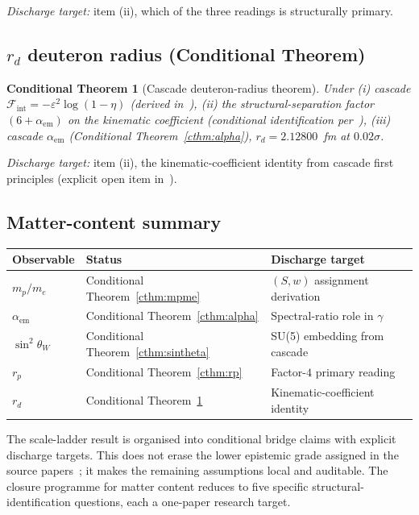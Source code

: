 \documentclass[11pt]{article}
\theoremstyle{plain}
\newtheorem{conditional}[theorem]{Conditional Theorem}
\theoremstyle{definition}
\theoremstyle{remark}
\begin{document}
\emph{Discharge target:} item (ii), which of the three readings is structurally primary.

\subsection{$r_d$ deuteron radius (Conditional Theorem)}\label{sec:matter-rd}

\begin{conditional}[Cascade deuteron-radius theorem]\label{cthm:rd}
Under (i) cascade $\mathcal{F}_\mathrm{int} = -\varepsilon^2 \log(1-\eta)$ (derived in~\citealp{SmartXXXII}), (ii) the structural-separation factor $(6 + \alpha_\mathrm{em})$ on the kinematic coefficient (conditional identification per~\citealp{SmartXXXII}), (iii) cascade $\alpha_\mathrm{em}$ (Conditional Theorem~\ref{cthm:alpha}), $r_d = 2.12800$~fm at $0.02\sigma$.
\end{conditional}

\emph{Discharge target:} item (ii), the kinematic-coefficient identity from cascade first principles (explicit open item in~\citealp{SmartXXXII}).

\subsection{Matter-content summary}\label{sec:matter-summary}

\begin{center}
\renewcommand{\arraystretch}{1.2}
\footnotesize
\begin{tabular}{l p{4cm} p{4.5cm}}
\toprule
\textbf{Observable} & \textbf{Status} & \textbf{Discharge target} \\
\midrule
$m_p/m_e$ & Conditional Theorem~\ref{cthm:mpme} & $(S,w)$ assignment derivation \\
$\alpha_\mathrm{em}$ & Conditional Theorem~\ref{cthm:alpha} & Spectral-ratio role in $\gamma$ \\
$\sin^2\theta_W$ & Conditional Theorem~\ref{cthm:sintheta} & SU(5) embedding from cascade \\
$r_p$ & Conditional Theorem~\ref{cthm:rp} & Factor-$4$ primary reading \\
$r_d$ & Conditional Theorem~\ref{cthm:rd} & Kinematic-coefficient identity \\
\bottomrule
\end{tabular}
\end{center}

The scale-ladder result is organised into conditional bridge claims with explicit discharge targets. This does not erase the lower epistemic grade assigned in the source papers~\citep{SmartV, SmartXXII, SmartXXXII}; it makes the remaining assumptions local and auditable. The closure programme for matter content reduces to five specific structural-identification questions, each a one-paper research target.
\end{document}
